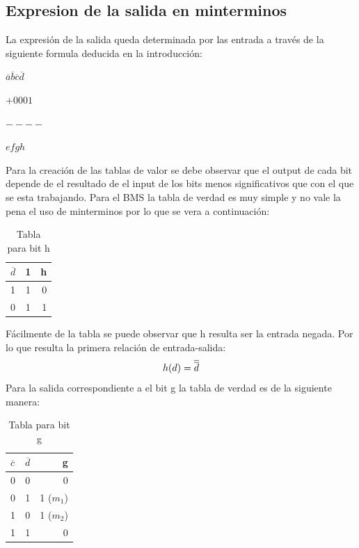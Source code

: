 \documentclass{article}
\begin{document}
	\subsection{Expresion de la salida en minterminos}
		\hspace{10mm} La expresión de la salida queda determinada por las entrada a través de la siguiente formula deducida en la introducción:
		\newline \centerline{$\overline{a} \overline{b} \overline{c} \overline{d}$}
		\newline \centerline{$+0001$}
		\newline \centerline{$----$}
		\newline \centerline{$efgh$}	
		\newline \hspace{10mm} Para la creación de las tablas de valor se debe observar que el output de cada bit depende de el resultado de el input de los bits menos significativos que con el que se esta trabajando.
		\newline Para el BMS la tabla de verdad es muy simple y no vale la pena el uso de minterminos por lo que se vera a continuación:
		\begin{table}[h!]
			\begin{center}
				\caption{Tabla para bit h}
				\begin{tabular}{l|c|r}
				\textbf{$\overline{d}$} & \textbf{1} & \textbf{h}\\
				\hline
				1 & 1 & 0 \\
				0 & 1 & 1 \\			
				\end{tabular}
			\end{center}
		\end{table}
		\newline Fácilmente de la tabla se puede observar que h resulta ser la entrada negada. Por lo que resulta la primera relación de entrada-salida:
		\begin{equation}
			\centerline{$h(d)=\overline{\overline{d}}$}
		\end{equation}
		\newline Para la salida correspondiente a el bit g la tabla de verdad es de la siguiente manera:
		\begin{table}[h!]
			\begin{center}
				\caption{Tabla para bit g}
				\begin{tabular}{l|c|r}
				\textbf{$\overline{c}$} & \textbf{$\overline{d}$} & \textbf{g}\\
				\hline
				0 & 0 & 0 \\
				0 & 1 & 1 ($m_{1}$) \\	
				1 & 0 & 1 ($m_{2}$)\\
				1 & 1 & 0 \\			
				\end{tabular}
			\end{center}
		\end{table}	
\end{document}
